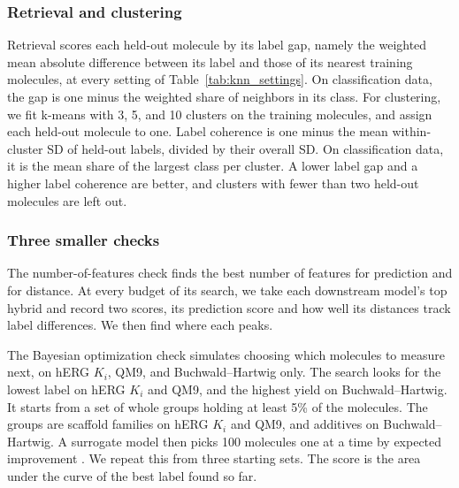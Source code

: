 \subsubsection{Retrieval and clustering}
Retrieval scores each held-out molecule by its label gap, namely the weighted mean absolute difference between its label and those of its nearest training molecules, at every setting of Table~\ref{tab:knn_settings}. On classification data, the gap is one minus the weighted share of neighbors in its class. For clustering, we fit k-means \citep{Lloyd1982} with 3, 5, and 10 clusters on the training molecules, and assign each held-out molecule to one. Label coherence is one minus the mean within-cluster SD of held-out labels, divided by their overall SD. On classification data, it is the mean share of the largest class per cluster. A lower label gap and a higher label coherence are better, and clusters with fewer than two held-out molecules are left out.

\subsubsection{Three smaller checks}
The number-of-features check finds the best number of features for prediction and for distance. At every budget of its search, we take each downstream model's top hybrid and record two scores, its prediction score and how well its distances track label differences. We then find where each peaks.

The Bayesian optimization check simulates choosing which molecules to measure next, on hERG $K_i$, QM9, and Buchwald--Hartwig only. The search looks for the lowest label on hERG $K_i$ and QM9, and the highest yield on Buchwald--Hartwig. It starts from a set of whole groups holding at least 5\% of the molecules. The groups are scaffold families on hERG $K_i$ and QM9, and additives on Buchwald--Hartwig. A surrogate model then picks 100 molecules one at a time by expected improvement \citep{Jones1998}. We repeat this from three starting sets. The score is the area under the curve of the best label found so far.

